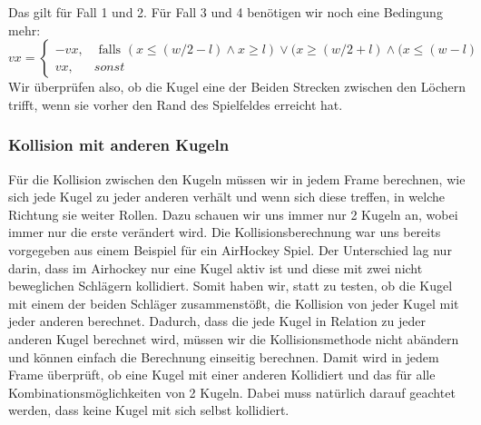 		Das gilt für Fall 1 und 2. Für Fall 3 und 4 benötigen wir noch eine Bedingung mehr:
		 \begin{equation}
		vx = \begin{cases}
		-vx, & \text{ falls } (x \leq (w/2 - l) \land x \geq l) \lor (x \geq (w/2 + l) \land (x \leq (w- l) \\
		vx, & sonst 
		\end{cases}
		\end{equation}
		Wir überprüfen also, ob die Kugel eine der Beiden Strecken zwischen den Löchern trifft, wenn sie vorher den Rand des Spielfeldes erreicht hat. 
	\subsubsection{Kollision mit anderen Kugeln}
		Für die Kollision zwischen den Kugeln müssen wir in jedem Frame berechnen, wie sich jede Kugel zu jeder anderen verhält und wenn sich diese treffen, in welche Richtung sie weiter Rollen. Dazu schauen wir uns immer nur 2 Kugeln an, wobei immer nur die erste verändert wird. 
		Die Kollisionsberechnung war uns bereits vorgegeben aus einem Beispiel für ein AirHockey Spiel. Der Unterschied lag nur darin, dass im Airhockey nur eine Kugel aktiv ist und diese mit zwei nicht beweglichen Schlägern kollidiert. Somit haben wir, statt zu testen, ob die Kugel mit einem der beiden Schläger zusammenstößt, die Kollision von jeder Kugel mit jeder anderen berechnet. Dadurch, dass die jede Kugel in Relation zu jeder anderen Kugel berechnet wird, müssen wir die Kollisionsmethode nicht abändern und können einfach die Berechnung einseitig berechnen. Damit wird in jedem Frame überprüft, ob eine Kugel mit einer anderen Kollidiert und das für alle Kombinationsmöglichkeiten von 2 Kugeln. Dabei muss natürlich darauf geachtet werden, dass keine Kugel mit sich selbst kollidiert. \\
		
